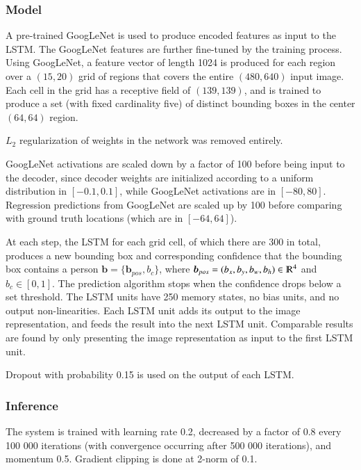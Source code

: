 \documentclass[a4paper, 12pt]{article}
\begin{document}
\subsubsection{Model}

A pre-trained GoogLeNet\citet{going-deeper-szegedy43022} is used to produce
encoded features as input to the LSTM\@. The GoogLeNet features are further
fine-tuned by the training process.  Using GoogLeNet, a feature vector of
length 1024 is produced for each region over a $(15, 20)$ grid of regions that
covers the entire $(480, 640)$ input image. Each cell in the grid has a
receptive field of $(139, 139)$, and is trained to produce a set (with fixed
cardinality five) of distinct bounding boxes in the center $(64, 64)$ region.

$L_2$ regularization of weights in the network was removed entirely.

GoogLeNet activations are scaled down by a factor of 100 before being input to
the decoder, since decoder weights are initialized according to a uniform
distribution in $[-0.1, 0.1]$, while GoogLeNet activations are in $[-80, 80]$.
Regression predictions from GoogLeNet are scaled up by 100 before comparing
with ground truth locations (which are in $[-64, 64]$).

At each step, the LSTM for each grid cell, of which there are 300 in total,
produces a new bounding box and corresponding confidence that the bounding box
contains a person $\boldsymbol{b} = \{\boldsymbol{b}_{pos}, b_c\}$, where
$\boldsymbol{b}_{pos} = (b_x, b_y, b_w, b_h) \in \varmathbb{R}^4$ and
$b_c \in [0, 1]$. The prediction algorithm stops when the confidence drops
below a set threshold. The LSTM units have 250 memory states, no bias units,
and no output non-linearities. Each LSTM unit adds its output to the image
representation, and feeds the result into the next LSTM unit. Comparable
results are found by only presenting the image representation as input to the
first LSTM unit.

Dropout with probability 0.15 is used on the output of each LSTM\@.

\subsubsection{Inference}

The system is trained with learning rate 0.2, decreased by a factor of 0.8
every 100 000 iterations (with convergence occurring after 500 000 iterations),
and momentum 0.5. Gradient clipping is done at 2-norm of 0.1.
\end{document}
